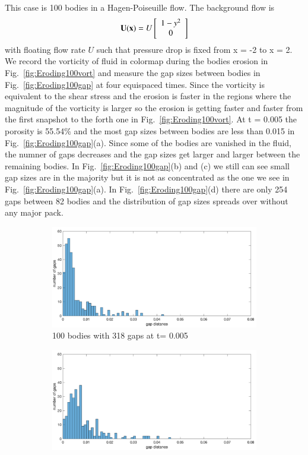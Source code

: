 \documentclass[preprint, 10pt]{elsarticle}
\begin{document}
{\color{red}
This case is 100 bodies in a Hagen-Poiseuille flow. The background
flow is 
\begin{align}
  {\mathbf{U}}({\mathbf{x}})=U \left[
  \begin{array}{c}
    1-y^2 \\ 0
  \end{array}
  \right]
\end{align}
with floating flow rate $U$ such that pressure drop is fixed from x = -2 to x = 2.
We record the vorticity of 
fluid in colormap during the bodies erosion in Fig.~\ref{fig:Eroding100vort} and 
measure the gap sizes between bodies in Fig.~\ref{fig:Eroding100gap} at four equispaced times.
Since the vorticity is equivalent to the shear stress and the erosion is faster in the regions where
the magnitude of the vorticity is larger 
so the erosion is getting faster and faster 
from the first snapshot to the forth one in Fig.~\ref{fig:Eroding100vort}.
At t = 0.005 the porosity is 55.54\% and the most gap sizes between bodies are less than 0.015 in 
Fig.~\ref{fig:Eroding100gap}(a). Since some of the bodies are vanished in the fluid, the numner of gaps 
decreases and the gap sizes get larger and larger between the remaining bodies. 
In Fig.~\ref{fig:Eroding100gap}(b) and (c) we still can see small gap sizes are in the majority but 
it is not as concentrated as the one we see in Fig.~\ref{fig:Eroding100gap}(a). 
In Fig.~\ref{fig:Eroding100gap}(d) there are only 254 gaps between 82 bodies and 
the distribution of gap sizes spreads over without any major pack.  
\begin{figure}[H]
\begin{subfigure}[b]{0.5\textwidth}
\includegraphics*[width =\linewidth]{./figs/gap_hist100_50}
\caption{100 bodies with 318 gaps at t= 0.005}
\end{subfigure}%
\begin{subfigure}[b]{0.5\textwidth}
\includegraphics*[width =\linewidth]{./figs/gap_hist100_100}

\end{subfigure}
\end{figure}}
\end{document}
